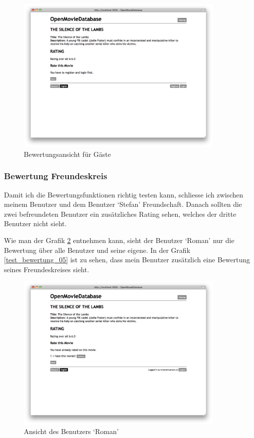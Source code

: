 \begin{figure}[ht]
    \begin{center}
        \includegraphics[width=0.9\textwidth,angle=0]{./bilder/tests/test_bewertung_03.png}
        \caption{Bewertungsansicht für Gäste}
        \label{test_bewertung_03}
    \end{center}
\end{figure}

\subsubsection{Bewertung Freundeskreis}
Damit ich die Bewertungsfunktionen richtig testen kann, schliesse ich
zwischen meinem Benutzer und dem Benutzer `Stefan' Freundschaft. Danach sollten 
die zwei befreundeten Benutzer ein zusätzliches Rating sehen, welches der dritte 
Benutzer nicht sieht. 

Wie man der Grafik \ref{test_bewertung_04} entnehmen kann, sieht der Benutzer
`Roman' nur die Bewertung über alle Benutzer und seine eigene. In der Grafik
\ref{test_bewertung_05} ist zu sehen, dass mein Benutzer zusätzlich eine
Bewertung seines Freundeskreises sieht.

\begin{figure}[ht]
    \begin{center}
        \includegraphics[width=0.9\textwidth,angle=0]{./bilder/tests/test_bewertung_04.png}
        \caption{Ansicht des Benutzers `Roman'}
        \label{test_bewertung_04}
    \end{center}
\end{figure}

